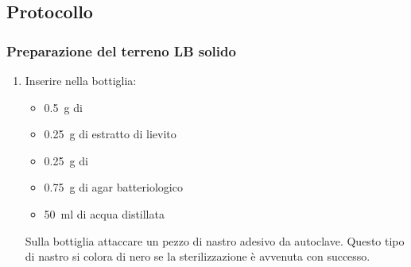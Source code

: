 \subsection{Protocollo}
\subsubsection{Preparazione del terreno LB solido}
\begin{enumerate}
	\item Inserire nella bottiglia:
	\begin{itemize}[person]
		\item \qty{0.5}{\g} di 
		\item \qty{0.25}{\g} di estratto di lievito
		\item \qty{0.25}{\g} di 
		\item \qty{0.75}{\g} di agar batteriologico
		\item \qty{50}{\ml} di acqua distillata
	\end{itemize}
	\begin{Note}
		Sulla bottiglia attaccare un pezzo di nastro adesivo da autoclave. Questo tipo di nastro si colora di nero se la sterilizzazione è avvenuta con successo.
	\end{Note}


\end{enumerate}
